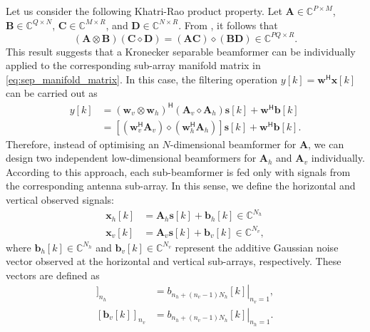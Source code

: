\documentclass{cta-author}
\newcommand{\bmm}[1]{\ensuremath{\mathbb{#1}}}				%
\newcommand{\hermit}{\mathsf{H}}					%
\begin{document}
Let us consider the following Khatri-Rao product property. Let $\bm{A} \in \bmm{C}^{P \times M}$, $\bm{B} \in \bmm{C}^{Q\times N}$, $\bm{C} \in \bmm{C}^{M \times R}$, and $\bm{D} \in \bmm{C}^{N \times R}$. From \cite{liu_hadamard_2008}, it follows that
\begin{equation} \label{eq:krkron}
	(\bm{A} \otimes \bm{B}) (\bm{C} \diamond \bm{D}) = (\bm{AC}) \diamond (\bm{BD}) \in \bmm{C}^{PQ \times R}.
\end{equation}
This result suggests that a Kronecker separable beamformer can be individually applied to the corresponding sub-array manifold matrix in \eqref{eq:sep_manifold_matrix}. In this case, the filtering operation $y[k] = \bm{w}^\hermit \bm{x}[k]$ can be carried out as
\begin{align}
y[k] &= (\bm{w}_v \otimes \bm{w}_h)^\hermit (\bm{A}_v \diamond \bm{A}_h)\bm{s}[k] + \bm{w}^\hermit \bm{b}[k]\\
	    &= \left[(\bm{w}_v^\hermit \bm{A}_v) \diamond (\bm{w}_h^\hermit \bm{A}_h)\right]\bm{s}[k] + \bm{w}^\hermit \bm{b}[k].
\end{align}
Therefore, instead of optimising an $N$-dimensional beamformer for $\bm{A}$, we can design two independent low-dimensional beamformers for $\bm{A}_h$ and $\bm{A}_v$ individually. According to this approach, each sub-beamformer is fed only with signals from the corresponding antenna sub-array. In this sense, we define the horizontal and vertical observed signals:
\begin{align}
\bm{x}_h[k] &= \bm{A}_h \bm{s}[k] + \bm{b}_h[k] \in \bmm{C}^{N_h} \\
\bm{x}_v[k] &= \bm{A}_v \bm{s}[k] + \bm{b}_v[k] \in \bmm{C}^{N_v},
\end{align}
where $\bm{b}_h[k] \in \bmm{C}^{N_h}$ and $\bm{b}_v[k] \in \bmm{C}^{N_v}$ represent the additive Gaussian noise vector observed at the horizontal and vertical sub-arrays, respectively. These vectors are defined as
\begin{align}
[\bm{b}_h[k]]_{n_h} &= \left. b_{n_h + (n_v-1)N_h} [k]\right|_{n_v=1},\\
[\bm{b}_v[k]]_{n_v} &= \left. b_{n_h + (n_v-1)N_h} [k]\right|_{n_h=1}.
\end{align}
\end{document}
